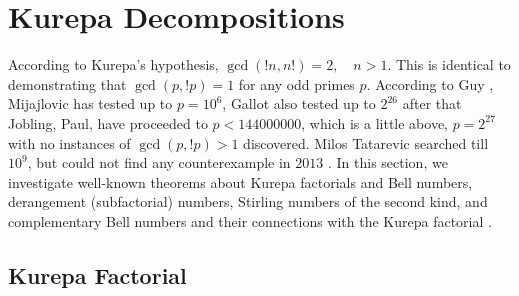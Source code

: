 \documentclass[pdflatex,sn-mathphys-num]{sn-jnl}%
\newtheorem{theorem}{Theorem}
\theoremstyle{thmstyleone}%
\theoremstyle{thmstyletwo}%
\theoremstyle{thmstylethree}%
\begin{document}


\section{Kurepa Decompositions}\label{Kall}
According to Kurepa's hypothesis, $\gcd(!n,n!) = 2,\quad n > 1$. This is identical to demonstrating that $\gcd(p,!p) = 1$ for any odd primes $p$. According to Guy \cite{guy2004unsolved}, Mijajlovic has tested up to $p = 10^6$, Gallot also tested up to $2^{26}$ after that Jobling, Paul, have proceeded to $p < 144000000$, which is a little above, $p = 2^{27}$ with no instances of $\gcd(p,!p) > 1$  discovered. %
Milos Tatarevic searched till $10^9$, but could not find any counterexample in $2013$ \cite{andrejic2016searching}. In this section, we investigate well-known theorems about Kurepa factorials and Bell numbers, derangement (subfactorial) numbers, Stirling numbers of the second kind, and complementary Bell numbers and their connections with the Kurepa factorial \cite{clarke1993derangements, kurepa1971left, comtet2012advanced, riordan2014introduction, bell1938iterated, bell1934exponential, berend2010improved, amdeberhan2013complementary, kurepa1974some, ivic2003kurepa, fabianogcd}.

\subsection{Kurepa Factorial}
\end{document}
